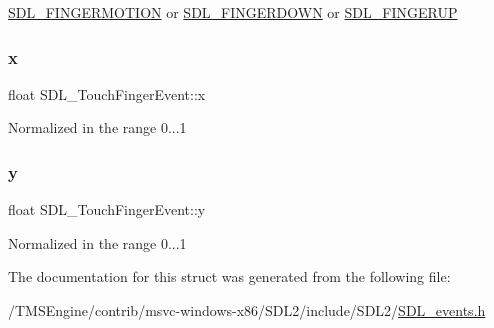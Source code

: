 \hyperlink{_s_d_l__events_8h_a3b589e89be6b35c02e0dd34a55f3fccaa1862d7d009ade2c79b2f1fe4a30c9dd2}{S\+D\+L\+\_\+\+F\+I\+N\+G\+E\+R\+M\+O\+T\+I\+ON} or \hyperlink{_s_d_l__events_8h_a3b589e89be6b35c02e0dd34a55f3fccaaa712d1fa8bb69f6042e24a31e835a9ec}{S\+D\+L\+\_\+\+F\+I\+N\+G\+E\+R\+D\+O\+WN} or \hyperlink{_s_d_l__events_8h_a3b589e89be6b35c02e0dd34a55f3fccaa8266a108a628cc698c5172e72c1fc1e6}{S\+D\+L\+\_\+\+F\+I\+N\+G\+E\+R\+UP} \mbox{\label{struct_s_d_l___touch_finger_event_a0ce44b1342220fa17e9b9b4a77c2c906}} 
\subsubsection{\texorpdfstring{x}{x}}
{\footnotesize\ttfamily float S\+D\+L\+\_\+\+Touch\+Finger\+Event\+::x}

Normalized in the range 0...1 \mbox{\label{struct_s_d_l___touch_finger_event_ac2bb8af638d2927a8e13f6ffe8f9384e}} 
\subsubsection{\texorpdfstring{y}{y}}
{\footnotesize\ttfamily float S\+D\+L\+\_\+\+Touch\+Finger\+Event\+::y}

Normalized in the range 0...1 

The documentation for this struct was generated from the following file\+:\begin{DoxyCompactItemize}
\item 
/\+T\+M\+S\+Engine/contrib/msvc-\/windows-\/x86/\+S\+D\+L2/include/\+S\+D\+L2/\hyperlink{_s_d_l__events_8h}{S\+D\+L\+\_\+events.\+h}\end{DoxyCompactItemize}
